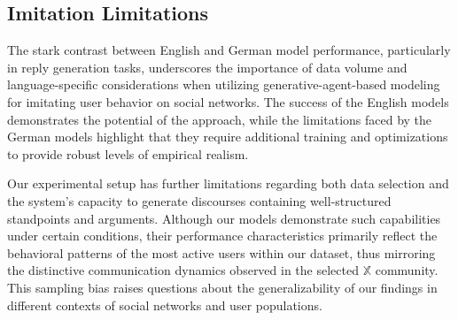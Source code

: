 \subsection{Imitation Limitations}
\label{subsec:ImiLimi}
The stark contrast between English and German model performance, particularly in reply generation tasks, underscores the importance of data volume and language-specific considerations when utilizing generative-agent-based modeling for imitating user behavior on social networks. The success of the English models demonstrates the potential of the approach, while the limitations faced by the German models highlight that they require additional training and optimizations to provide robust levels of empirical realism.

Our experimental setup has further limitations regarding both data selection and the system's capacity to generate discourses containing well-structured standpoints and arguments. Although our models demonstrate such capabilities under certain conditions, their performance characteristics primarily reflect the behavioral patterns of the most active users within our dataset, thus mirroring the distinctive communication dynamics observed in the selected $\mathbb{X}$ community. This sampling bias raises questions about the generalizability of our findings in different contexts of social networks and user populations.
